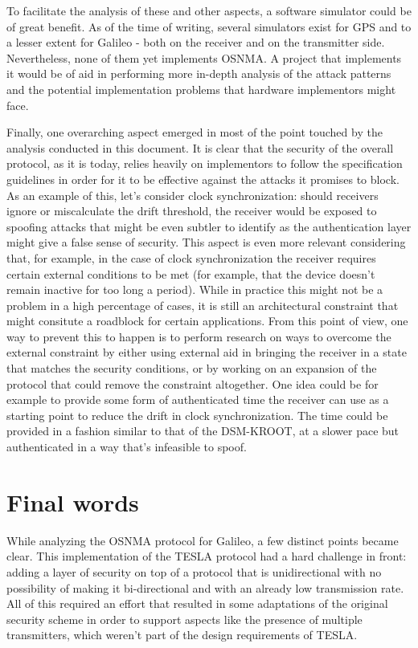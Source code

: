 To facilitate the analysis of these and other aspects, a software simulator
could be of great benefit. As of the time of writing, several simulators exist
for GPS and to a lesser extent for Galileo - both on the receiver and on the
transmitter side. Nevertheless, none of them yet implements OSNMA. A project
that implements it would be of aid in performing more in-depth analysis of the
attack patterns and the potential implementation problems that hardware
implementors might face.

\vspace{\baselineskip}

Finally, one overarching aspect emerged in most of the point touched by the
analysis conducted in this document. It is clear that the security of the
overall protocol, as it is today, relies heavily on implementors to follow the
specification guidelines in order for it to be effective against the attacks it
promises to block. As an example of this, let's consider clock synchronization:
should receivers ignore or miscalculate the drift threshold, the receiver would
be exposed to spoofing attacks that might be even subtler to identify as the
authentication layer might give a false sense of security. This aspect is even
more relevant considering that, for example, in the case of clock
synchronization the receiver requires certain external conditions to be met (for
example, that the device doesn't remain inactive for too long a period). While
in practice this might not be a problem in a high percentage of cases, it is
still an architectural constraint that might consitute a roadblock for certain
applications. From this point of view, one way to prevent this to happen is to
perform research on ways to overcome the external constraint by either using
external aid in bringing the receiver in a state that matches the security
conditions, or by working on an expansion of the protocol that could remove the
constraint altogether. One idea could be for example to provide some form of
authenticated time the receiver can use as a starting point to reduce the drift in
clock synchronization. The time could be provided in a fashion similar to that
of the DSM-KROOT, at a slower pace but authenticated in a way that's infeasible
to spoof.

\section{Final words}

While analyzing the OSNMA protocol for Galileo, a few distinct points became
clear. This implementation of the TESLA protocol had a hard challenge in front:
adding a layer of security on top of a protocol that is unidirectional with no
possibility of making it bi-directional and with an already low
transmission rate. All of this required an effort that resulted in some
adaptations of the original security scheme in order to support aspects like the
presence of multiple transmitters, which weren't part of the design requirements
of TESLA.

